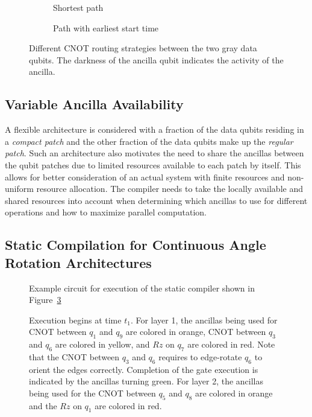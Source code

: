 \begin{figure}
    \centering
    \begin{subfigure}{0.49\columnwidth}
        
        \caption{Shortest path}
    \end{subfigure}
    \begin{subfigure}{0.49\columnwidth}
        
        \caption{Path with earliest start time}
    \end{subfigure}
    \caption{Different CNOT routing strategies between the two gray data qubits. The darkness of the ancilla qubit indicates the activity of the ancilla.}
    \label{fig:cnot_selection}
\end{figure}

\subsection{Variable Ancilla Availability}\label{section:variableancilla}
A flexible architecture is considered with a fraction of the data qubits residing in a \textit{compact patch} and the other fraction of the data qubits make up the \textit{regular patch}. Such an architecture also motivates the need to share the ancillas between the qubit patches due to limited resources available to each patch by itself. This allows for better consideration of an actual system with finite resources and non-uniform resource allocation. The compiler needs to take the locally available and shared resources into account when determining which ancillas to use for different operations and how to maximize parallel computation.

\subsection{Static Compilation for Continuous Angle Rotation Architectures}
\begin{figure}
    \centering
    \scalebox{0.7}{
    }
    \caption{Example circuit for execution of the static compiler shown in Figure~\ref{fig:baseline_execution}}
    \label{fig:baseline_circuit}
\end{figure}
\begin{figure}
    \centering
    
    \caption{Execution begins at time $t_1$. For layer 1, the ancillas being used for CNOT between $q_1$ and $q_9$ are colored in orange, CNOT between $q_3$ and $q_6$ are colored in yellow, and $Rz$ on $q_7$ are colored in red. Note that the CNOT between $q_3$ and $q_6$ requires to edge-rotate $q_6$ to orient the edges correctly. Completion of the gate execution is indicated by the ancillas turning green. For layer 2, the ancillas being used for the CNOT between $q_5$ and $q_8$ are colored in orange and the $Rz$ on $q_1$ are colored in red.}
    \label{fig:baseline_execution}
\end{figure}

